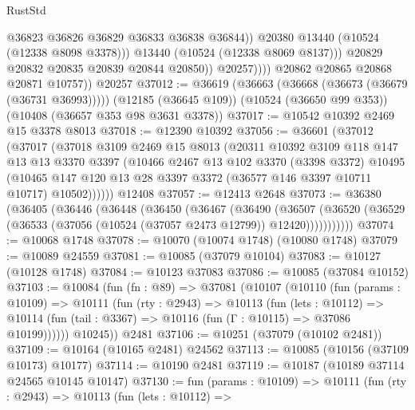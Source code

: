 \begin{lexlean}{RustStd}
\begin{coremodule}
                            @36823
                            @36826
                            @36829
                            @36833
                            @36838
                            @36844))
                        @20380
                        @13440
                        (@10524 (@12338 @8098 @3378)))
                      @13440
                      (@10524 (@12338 @8069 @8137)))
                    @20829
                    @20832
                    @20835
                    @20839
                    @20844
                    @20850))
                @20257))))
        @20862
        @20865
        @20868
        @20871
        @10757))
    @20257
@37012 := @36619
    (@36663 (@36668 (@36673 (@36679 (@36731 @36993)))))
    (@12185 (@36645 @109))
    (@10524 (@36650 @99 @353))
    (@10408 (@36657 @353 @98 @3631 @3378))
@37017 := @10542 @10392 @2469 @15 @3378 @8013
@37018 := @12390 @10392
@37056 := @36601
    (@37012
      (@37017
        (@37018
          @3109
          @2469
          @15
          @8013
          (@20311
            @10392
            @3109
            @118
            @147
            @13
            @13
            @3370
            @3397
            (@10466
              @2467
              @13
              @102
              @3370
              (@3398 @3372)
              @10495
              (@10465 @147 @120 @13 @28 @3397 @3372 (@36577 @146 @3397 @10711 @10717) @10502))))))
    @12408
@37057 := @12413 @2648
@37073 := @36380
    (@36405
      (@36446
        (@36448
          (@36450
            (@36467
              (@36490
                (@36507
                  (@36520 (@36529 (@36533 (@37056 (@10524 (@37057 @2473 @12799)) @12420)))))))))))
@37074 := @10068 @1748
@37078 := @10070 (@10074 @1748) (@10080 @1748)
@37079 := @10089 @24559
@37081 := @10085 (@37079 @10104)
@37083 := @10127 (@10128 @1748)
@37084 := @10123 @37083
@37086 := @10085 (@37084 @10152)
@37103 := @10084
    (fun (fn : @89) =>
    @37081
      (@10107
        (@10110
          (fun (params : @10109) =>
          @10111
            (fun (rty : @2943) =>
            @10113
              (fun (lets : @10112) =>
              @10114 (fun (tail : @3367) => @10116 (fun (Γ : @10115) => @37086 @10199))))))
        @10245))
    @2481
@37106 := @10251 (@37079 (@10102 @2481))
@37109 := @10164 (@10165 @2481) @24562
@37113 := @10085 (@10156 (@37109 @10173) @10177)
@37114 := @10190 @2481
@37119 := @10187 (@10189 @37114 @24565 @10145 @10147)
@37130 := fun (params : @10109) =>
  @10111
    (fun (rty : @2943) =>
    @10113
      (fun (lets : @10112) =>

\end{coremodule}
\end{lexlean}
